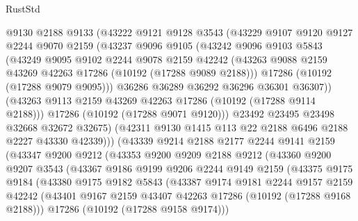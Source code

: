 \begin{lexlean}{RustStd}
\begin{coremodule}
              @9130
              @2188
              @9133
              (@43222
                @9121
                @9128
                @3543
                (@43229
                  @9107
                  @9120
                  @9127
                  @2244
                  @9070
                  @2159
                  (@43237
                    @9096
                    @9105
                    (@43242
                      @9096
                      @9103
                      @5843
                      (@43249
                        @9095
                        @9102
                        @2244
                        @9078
                        @2159
                        @42242
                        (@43263 @9088 @2159 @43269 @42263 @17286 (@10192 (@17288 @9089 @2188)))
                        @17286
                        (@10192 (@17288 @9079 @9095)))
                      @36286
                      @36289
                      @36292
                      @36296
                      @36301
                      @36307))
                  (@43263 @9113 @2159 @43269 @42263 @17286 (@10192 (@17288 @9114 @2188)))
                  @17286
                  (@10192 (@17288 @9071 @9120)))
                @23492
                @23495
                @23498
                @32668
                @32672
                @32675)
              (@42311 @9130 @1415 @113 @22 @2188 @6496 @2188 @2227 @43330 @42339)))
          (@43339
            @9214
            @2188
            @2177
            @2244
            @9141
            @2159
            (@43347
              @9200
              @9212
              (@43353
                @9200
                @9209
                @2188
                @9212
                (@43360
                  @9200
                  @9207
                  @3543
                  (@43367
                    @9186
                    @9199
                    @9206
                    @2244
                    @9149
                    @2159
                    (@43375
                      @9175
                      @9184
                      (@43380
                        @9175
                        @9182
                        @5843
                        (@43387
                          @9174
                          @9181
                          @2244
                          @9157
                          @2159
                          @42242
                          (@43401 @9167 @2159 @43407 @42263 @17286 (@10192 (@17288 @9168 @2188)))
                          @17286
                          (@10192 (@17288 @9158 @9174)))

\end{coremodule}
\end{lexlean}
